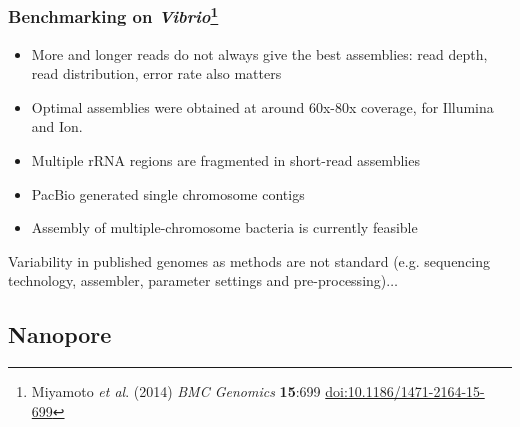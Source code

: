 \begin{frame}
  \frametitle{Benchmarking on \textit{Vibrio}\footnote{\tiny{Miyamoto \textit{et al}. (2014) \textit{BMC Genomics} \textbf{15}:699 \href{http://dx.doi.org/10.1186/1471-2164-15-699}{doi:10.1186/1471-2164-15-699}}}}
  \begin{itemize}
    \item More and longer reads do not always give the best assemblies: read depth, read distribution, error rate also matters
    \item Optimal assemblies were obtained at around 60x-80x coverage, for Illumina and Ion.
    \item Multiple rRNA regions are fragmented in short-read assemblies
    \item PacBio generated single chromosome contigs
    \item Assembly of multiple-chromosome bacteria is currently feasible
  \end{itemize}  
  Variability in published genomes as methods are not standard (e.g. sequencing technology, assembler, parameter settings and pre-processing)$\ldots$
\end{frame}

\subsection{Nanopore}

